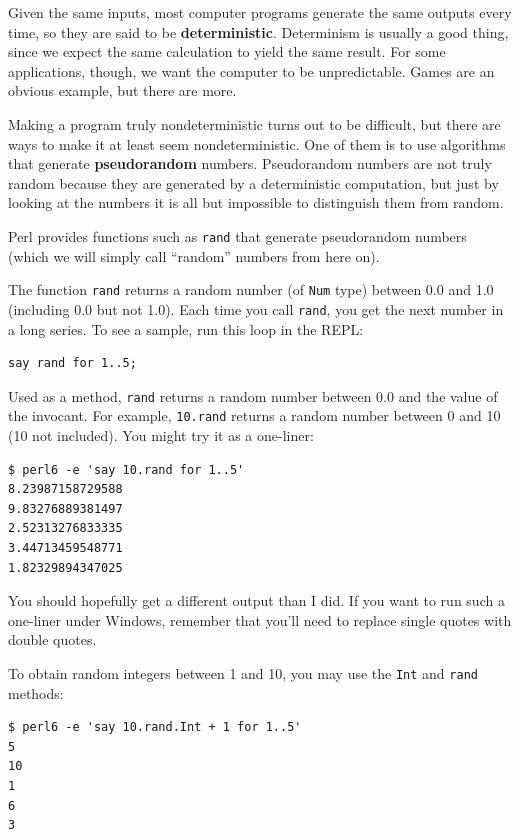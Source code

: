 Given the same inputs, most computer programs generate the same
outputs every time, so they are said to be {\bf deterministic}.
Determinism is usually a good thing, since we expect the same
calculation to yield the same result.  For some applications, though,
we want the computer to be unpredictable.  Games are an obvious
example, but there are more.

Making a program truly nondeterministic turns out to be difficult,
but there are ways to make it at least seem nondeterministic.  One of
them is to use algorithms that generate {\bf pseudorandom} numbers.
Pseudorandom numbers are not truly random because they are generated
by a deterministic computation, but just by looking at the numbers it
is all but impossible to distinguish them from random.

Perl provides functions such as {\tt rand} that generate
pseudorandom numbers (which we will simply call ``random'' 
numbers from here on).

The function {\tt rand} returns a random number (of {\tt Num} 
type) between 0.0 and 1.0 (including 0.0 but not 1.0).  Each time you
call {\tt rand}, you get the next number in a long series.  To see a
sample, run this loop in the REPL:

\begin{verbatim}
say rand for 1..5;
\end{verbatim}

Used as a method, {\tt rand} returns a random number between 
0.0 and the value of the invocant. For example, {\tt 10.rand} 
returns a random number between 0 and 10 (10 not included). You
might try it as a one-liner:

\begin{verbatim}
$ perl6 -e 'say 10.rand for 1..5'
8.23987158729588
9.83276889381497
2.52313276833335
3.44713459548771
1.82329894347025
\end{verbatim}
 
You should hopefully get a different output than I did. If 
you want to run such a one-liner under Windows, remember 
that you'll need to replace single quotes with double quotes.

To obtain random integers between 1 and 10, you may use 
the {\tt Int} and {\tt rand} methods:

\begin{verbatim}
$ perl6 -e 'say 10.rand.Int + 1 for 1..5'
5
10
1
6
3
\end{verbatim}

